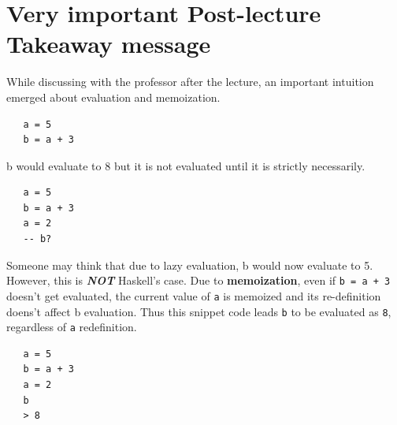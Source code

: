 \section{Very important Post-lecture Takeaway message}
While discussing with the professor after the lecture,
an important intuition emerged about evaluation and memoization.
\begin{lstlisting}
   a = 5
   b = a + 3
\end{lstlisting}
b would evaluate to 8 but it is not evaluated until it is strictly necessarily.

\begin{lstlisting}
   a = 5
   b = a + 3
   a = 2
   -- b?
\end{lstlisting}
Someone may think that due to lazy evaluation,
b would now evaluate to 5.
However, this is \textit{\textbf{NOT}} Haskell's case.
Due to \textbf{memoization},
even if \lstinline|b = a + 3| doesn't get evaluated,
the current value of \texttt{a} is memoized and its re-definition doens't affect b evaluation.
Thus this snippet code leads \texttt{b} to be evaluated as \texttt{8},
regardless of \texttt{a} redefinition.
\begin{lstlisting}
   a = 5
   b = a + 3
   a = 2
   b
   > 8
\end{lstlisting}
